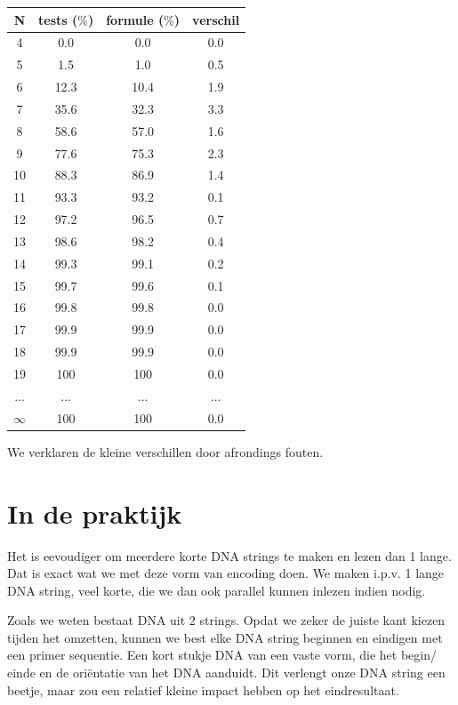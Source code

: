 \documentclass{esannV2}
\begin{document}
\begin{center}
\begin{tabular}{c|| c | c || c}
	N & tests ($\%$) & formule ($\%$) & verschil \\
	\hline
	4 & 0.0 & 0.0 & 0.0\\
	5 & 1.5 & 1.0  & 0.5\\
	6 & 12.3 & 10.4 & 1.9\\
	7 & 35.6 & 32.3 & 3.3\\
	8 & 58.6 & 57.0 & 1.6\\
	9 & 77.6 & 75.3 & 2.3\\
	10 & 88.3 & 86.9 & 1.4\\
	11 & 93.3 & 93.2 & 0.1\\
	12 & 97.2 & 96.5 & 0.7\\
	13 & 98.6 & 98.2 & 0.4\\
	14 & 99.3 & 99.1 & 0.2\\
	15 & 99.7 & 99.6 & 0.1\\
	16 & 99.8 & 99.8 & 0.0\\
	17 & 99.9 & 99.9  & 0.0\\
	18 & 99.9 & 99.9  & 0.0\\
	19 & 100 & 100  & 0.0\\
	...  & ... & ... & ...\\
	
	$\infty$ & 100 & 100  & 0.0\\
	
\end{tabular}
\end{center}

We verklaren de kleine verschillen door afrondings fouten.


\section{In de praktijk}

Het is eevoudiger om meerdere korte DNA strings te maken en lezen dan 1 lange. Dat is exact wat we met deze vorm van encoding doen. We maken i.p.v. 1 lange DNA string, veel korte, die we dan ook parallel kunnen inlezen indien nodig.
\newline

Zoals we weten bestaat DNA uit 2 strings. Opdat we zeker de juiste kant kiezen tijden het omzetten, kunnen we best elke DNA string beginnen en eindigen met een primer sequentie. Een kort stukje DNA van een vaste vorm, die het begin/ einde en de ori\"entatie van het DNA aanduidt. Dit verlengt onze DNA string een beetje, maar zou een relatief kleine impact hebben op het eindresultaat.
\newline
\end{document}
